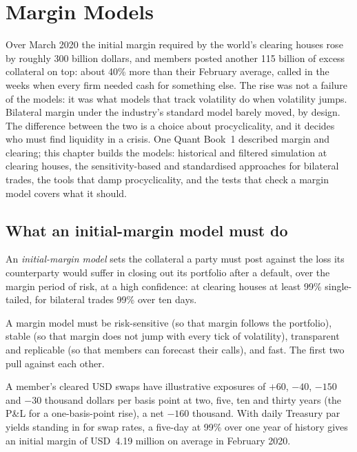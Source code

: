 \chapter{Margin Models}\label{ch:rc:margin-models}

Over March 2020 the initial margin required by the world's clearing houses rose by roughly 300
billion dollars, and members posted another 115 billion of excess collateral on top: about 40\%
more than their February average, called in the weeks when every firm needed cash for something
else. The rise was not a failure of the models: it was what models that track volatility do when
volatility jumps. Bilateral margin under the industry's standard model barely moved, by design.
The difference between the two is a choice about procyclicality, and it decides who must find
liquidity in a crisis. One Quant Book~1 described margin and clearing; this chapter builds the
models: historical and filtered simulation at clearing houses, the sensitivity-based and
standardised approaches for bilateral trades, the tools that damp procyclicality, and the tests
that check a margin model covers what it should.

\section{What an initial-margin model must do}

\begin{definition}\label{def:rc:margin-models:model}
An \emph{initial-margin model} sets the collateral a party must post
against the loss its counterparty would suffer in closing out its portfolio after a default, over
the margin period of risk, at a high confidence: at clearing houses at least 99\% single-tailed, for
bilateral trades 99\% over ten days.
\end{definition}

A margin model must be risk-sensitive (so that margin follows the portfolio), stable (so that
margin does not jump with every tick of volatility), transparent and replicable (so that members
can forecast their calls), and fast. The first two pull against each other.

\begin{example}\label{ex:rc:margin-models:book}
A member's cleared USD swaps have illustrative exposures of $+60$, $-40$, $-150$ and $-30$ thousand
dollars per basis point at two, five, ten and thirty years (the P\&L for a one-basis-point rise), a net
$-160$ thousand. With daily Treasury par yields standing in for swap rates, a five-day  at 99\% over one year of history gives an initial margin of USD~4.19 million on average in
February 2020.
\end{example}

